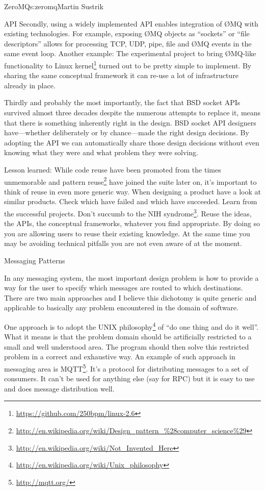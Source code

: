 \begin{aosachapter}{ZeroMQ}{s:zeromq}{Martin Sustrik}
\begin{aosasect1}{API}
Secondly, using a widely implemented API enables integration of ØMQ
with existing technologies. For example, exposing ØMQ objects as
``sockets'' or ``file descriptors'' allows for processing TCP, UDP,
pipe, file and ØMQ events in the same event loop. Another example: The
experimental project to bring ØMQ-like functionality to Linux
kernel\footnote{\url{https://github.com/250bpm/linux-2.6}} turned out
to be pretty simple to implement. By sharing the same conceptual
framework it can re-use a lot of infrastructure already in place.

Thirdly and probably the most importantly, the fact that BSD socket
APIs survived almost three decades despite the numerous attempts to
replace it, means that there is something inherently right in the
design. BSD socket API designers have---whether deliberately or by
chance---made the right design decisions. By adopting the API we can
automatically share those design decisions without even knowing what
they were and what problem they were solving.

Lesson learned: While code reuse have been promoted from the times
unmemorable and pattern
reuse\footnote{\url{http://en.wikipedia.org/wiki/Design_pattern_\%28computer_science\%29}}
have joined the suite later on, it's important to think of reuse in
even more generic way. When designing a product have a look at similar
products. Check which have failed and which have succeeded. Learn from
the successful projects. Don't succumb to the NIH
syndrome\footnote{\url{http://en.wikipedia.org/wiki/Not_Invented_Here}}. Reuse
the ideas, the APIs, the conceptual frameworks, whatever you find
appropriate. By doing so you are allowing users to reuse their
existing knowledge. At the same time you may be avoiding technical
pitfalls you are not even aware of at the moment.

\end{aosasect1}

\begin{aosasect1}{Messaging Patterns}

In any messaging system, the most important design problem is how to
provide a way for the user to specify which messages are routed to
which destinations.  There are two main approaches and I believe this
dichotomy is quite generic and applicable to basically any problem
encountered in the domain of software.

One approach is to adopt the UNIX
philosophy\footnote{\url{http://en.wikipedia.org/wiki/Unix_philosophy}}
of ``do one thing and do it well''. What it means is that the problem
domain should be artificially restricted to a small and well
understood area. The program should then solve this restricted problem
in a correct and exhaustive way. An example of such approach in
messaging area is MQTT\footnote{\url{http://mqtt.org/}}. It's a
protocol for distributing messages to a set of consumers. It can't be
used for anything else (say for RPC) but it is easy to use and does
message distribution well.


\end{aosasect1}
\end{aosachapter}
